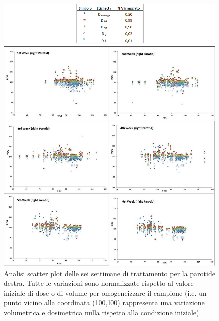 \begin{figure}
\centerline{
\hspace{-1.6cm}\includegraphics[width=1.32\textwidth]{./cap3/Modena_trend_s.png}}
\caption{Analisi scatter plot delle sei settimane di trattamento per la parotide destra. Tutte le variazioni sono normalizzate rispetto al valore iniziale di dose o di volume per omogeneizzare il campione (i.e. un punto vicino alla coordinata (100,100) rappresenta una variazione volumetrica e dosimetrica nulla rispetto alla condizione iniziale).}
\label{fig:Modena_trend}
\end{figure}

